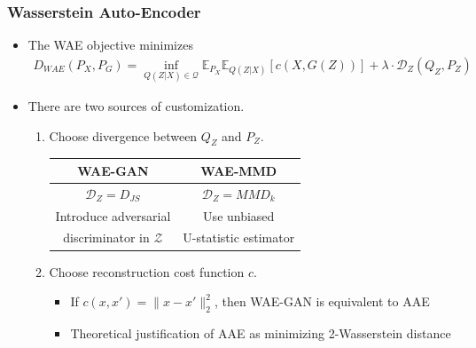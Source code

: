 \documentclass{beamer}
\newcommand{\E}{\mathbb{E}}
\newcommand{\col}[1]{\textcolor{lred}{#1}}
\begin{document}
\begin{frame}
\frametitle{Wasserstein Auto-Encoder}
\begin{itemize}
\item The \col{WAE objective} minimizes
\begin{align*}
D_{WAE}(P_X, P_G) =  \inf_{Q(Z \vert X) \in \mathcal{Q}} \E_{P_X} \E_{Q(Z \vert X)} [c(X, G(Z))]+ \lambda \cdot \mathcal{D}_Z(Q_Z, P_Z)
\end{align*}
\pause

\item There are two sources of customization.  
\pause
\begin{enumerate}
\item Choose \col{divergence} between $Q_Z$ and $P_Z$.

\pause
\begin{center}
\begin{tabular}{  c || c  }
 \hline \hline 
 WAE-GAN & WAE-MMD \\ 
 \hline 
 $\mathcal{D}_Z = D_{JS}$ & $\mathcal{D}_Z = MMD_k$ \\  
 Introduce adversarial & Use unbiased \\
 discriminator in $\mathcal{Z}$ & U-statistic estimator \\ 
 \hline \hline   
\end{tabular}
\end{center}

\pause
\item Choose \col{reconstruction cost} function $c$.  
\begin{itemize}
\pause
\item If $c(x, x') = \| x - x' \|_2^2$, then WAE-GAN is equivalent to AAE

\pause
\item Theoretical justification of AAE as minimizing 2-Wasserstein distance
\end{itemize}

\end{enumerate}
\end{itemize}
\end{frame}
\end{document}

